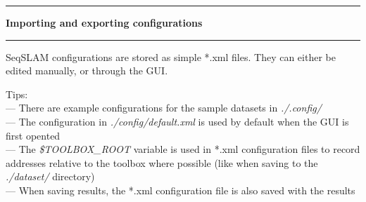 \noindent\rule{\textwidth}{1pt}
\indent \textbf{Importing and exporting configurations}
\noindent\rule{\textwidth}{1pt}
\smallskip
\parbox{\textwidth}{SeqSLAM configurations are stored as simple *.xml files. They can either be edited manually, or through the GUI.}
\bigskip
\parbox{\textwidth}{Tips: \\ --- There are example configurations for the sample datasets in \textit{./.config/} \\ --- The configuration in \textit{./config/default.xml} is used by default when the GUI is first opented \\ --- The \textit{\$TOOLBOX\_ROOT} variable is used in *.xml configuration files to record addresses relative to the toolbox where possible (like when saving to the \textit{./dataset/} directory) \\ --- When saving results, the *.xml configuration file is also saved with the results}
\smallskip
